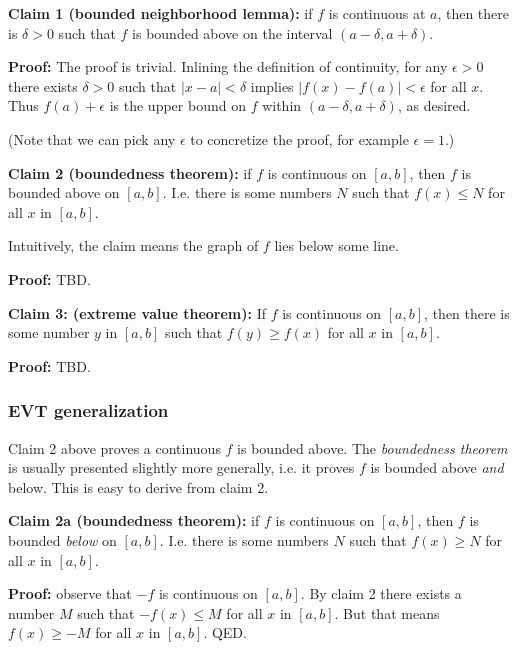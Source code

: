 \vs

\textbf{Claim 1 (bounded neighborhood lemma):} if $f$ is continuous at $a$, then there is $\delta>0$
such that $f$ is bounded above on the interval $(a-\delta, a+\delta)$.

\vs

\textbf{Proof:} The proof is trivial. Inlining the definition of
continuity, for any $\epsilon>0$ there exists $\delta>0$ such that
$|x-a|<\delta$ implies $|f(x)-f(a)|<\epsilon$ for all $x$. Thus
$f(a)+\epsilon$ is the upper bound on $f$ within
$(a-\delta, a+\delta)$, as desired.

\vs

(Note that we can pick any $\epsilon$ to concretize the proof, for example
$\epsilon=1$.)

\vs

\textbf{Claim 2 (boundedness theorem):} if $f$ is continuous on $[a,b]$, then $f$ is bounded
above on $[a,b]$. I.e. there is some numbers $N$ such that $f(x)\leq N$
for all $x$ in $[a,b]$.

\vs

Intuitively, the claim means the graph of $f$ lies below some line.

\vs

\textbf{Proof:} TBD.

\vs

\textbf{Claim 3: (extreme value theorem):} If $f$ is continuous on
$[a,b]$, then there is some number $y$ in $[a,b]$ such that
$f(y)\geq f(x)$ for all $x$ in $[a,b]$.

\vs

\textbf{Proof:} TBD.

\subsubsection*{EVT generalization}

Claim 2 above proves a continuous $f$ is bounded above. The
\textit{boundedness theorem} is usually presented slightly more
generally, i.e. it proves $f$ is bounded above \textit{and} below.
This is easy to derive from claim 2.

\vs

\textbf{Claim 2a (boundedness theorem):} if $f$ is continuous on
$[a,b]$, then $f$ is bounded \textit{below} on $[a,b]$. I.e. there is
some numbers $N$ such that $f(x)\geq N$ for all $x$ in $[a,b]$.

\vs

\textbf{Proof:} observe that $-f$ is continuous on $[a,b]$. By claim 2
there exists a number $M$ such that $-f(x)\leq M$ for all $x$ in
$[a,b]$. But that means $f(x)\geq -M$ for all $x$ in $[a,b]$. QED.

